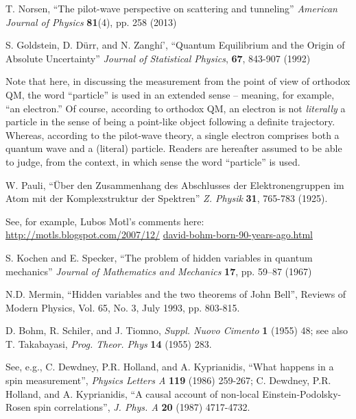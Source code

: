 \documentclass[aps,prc,onecolumn,letterpaper,floatfix,12pt]{revtex4}
\begin{document}
\begin{thebibliography}{99}

 T. Norsen, ``The pilot-wave perspective on scattering
  and tunneling'' \emph{American Journal of Physics} {\bf{81}}(4),
  pp. 258 (2013)

S. Goldstein, D. D\"urr, and N. Zangh{\'i'}, ``Quantum Equilibrium and the
Origin of Absolute Uncertainty'' \emph{Journal of Statistical
  Physics}, {\bf{67}}, 843-907 (1992)

Note that here, in discussing the measurement from the point of view
of orthodox QM, the word ``particle'' is used in an extended sense --
meaning, for example, ``an electron.''  Of course, according to
orthodox QM, an electron is not \emph{literally} a particle in the
sense of being a point-like object following a definite trajectory.
Whereas, according to the pilot-wave theory, a single electron
comprises both a quantum wave and a (literal) particle.  Readers are
hereafter assumed to be able to judge, from the context, in which sense the word
``particle'' is used.  


W. Pauli, ``\"Uber den Zusammenhang des Abschlusses der
Elektronengruppen im Atom mit der Komplexstruktur der Spektren'' \emph{Z. Physik} {\bf{31}}, 765-783 (1925).

See, for example, Lubos Motl's comments here:
\url{http://motls.blogspot.com/2007/12/}
\url{david-bohm-born-90-years-ago.html}

S. Kochen and E. Specker, ``The problem of hidden variables in quantum
mechanics'' \emph{Journal of Mathematics and Mechanics} {\bf{17}},
pp. 59–87 (1967)  
 

 N.D. Mermin, ``Hidden variables and the two theorems
  of John Bell'', Reviews of Modern Physics, Vol. 65, No. 3, July
  1993, pp. 803-815.



D. Bohm, R. Schiler, and J. Tiomno, \emph{Suppl. Nuovo Cimento}
{\bf{1}} (1955) 48; see also T. Takabayasi, \emph{Prog. Theor. Phys}
{\bf{14}} (1955) 283. 

See, e.g., C. Dewdney, P.R. Holland, and A. Kyprianidis, ``What happens in a spin
measurement'', \emph{Physics Letters A} {\bf{119}} (1986) 259-267;
C. Dewdney, P.R. Holland, and A. Kyprianidis, ``A causal account of
non-local Einstein-Podolsky-Rosen spin correlations'',
\emph{J. Phys. A} {\bf{20}} (1987) 4717-4732. 



\end{thebibliography}
\end{document}
